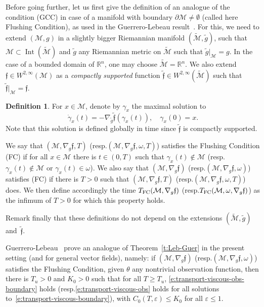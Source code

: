\documentclass[10pt]{amsart}
\newcommand{\FC}{\textup{FC}}
\newcommand{\pFC}{\textup{(FC)}\xspace}
\newcommand{\pGCC}{\textup{(GCC)}\xspace}
\theoremstyle{definition}
\newtheorem{definition}[lemma]{Definition}
\newcommand{\M}{\ensuremath{\mathcal M}}
\newcommand{\mb}[1]{\ensuremath{\mathbb{#1}}}
\newcommand{\R}{{\mb{R}}}
\newcommand{\f}{\ensuremath{\mathfrak{f}}}
\DeclareMathOperator{\Int}{Int}
\let\d\partial
\let\eps\varepsilon
\providecommand{\resp}{resp.}\providecommand{\cf}{cf.}
\begin{document}
Before going further, let us first give the definition of an analogue of the condition \pGCC in case of a manifold with boundary $\d\M \neq \emptyset$ (called here Flushing Condition), as used in the Guerrero-Lebeau result~\cite{GL:07}. For this, we need to extend $(\M,g)$ in a slightly bigger Riemannian manifold $(\tilde{\M}, \tilde{g})$, \ie such that $\M\subset \Int(\tilde{\M})$ and $\tilde{g}$ any Riemannian metric on $\tilde{\M}$ such that $\tilde{g}|_{\M}=g$. In the case of a bounded domain of $\R^n$, one may choose $\tilde{\M} = \R^n$. We also extend $\f \in W^{2,\infty}(\M)$ as a {\em compactly supported } function $\tilde{\f}\in W^{2,\infty}(\tilde{\M})$ such that $\tilde{\f}|_{\M} = \f$.
\begin{definition}
\label{d:def-GCC_bdry}
For $x\in \M$, denote by $\gamma_x$ the maximal solution to
\[
\dot{\gamma}_x(t) = -\nabla_{\tilde{g}}\tilde{\f}(\gamma_x(t)), \quad \gamma_x(0)=x. 
\]
Note that this solution is defined globally in time since $\tilde{\f}$ is compactly supported.

We say that $(\M,\nabla_g \f,T)$ (\resp $(\M,\nabla_g \f,\omega,T)$) satisfies the Flushing Condition \pFC if for all $x\in \M$ there is $t\in (0,T)$ such that $\gamma_x(t)\notin \M$ (\resp $\gamma_x(t)\notin \M$ or $\gamma_x(t)\in \omega$). We also say that $(\M,\nabla_g \f)$ (\resp $(\M,\nabla_g \f,\omega)$) satisfies \pFC if there is $T>0$ such that $(\M,\nabla_g \f,T)$ (\resp $(\M,\nabla_g \f,\omega,T)$) does. We then define accordingly the time $T_{\FC}(\M,\nabla_g \f)$ (\resp $T_{\FC}(\M,\omega,\nabla_g \f)$) as the infimum of $T>0$ for which this property holds.

Remark finally that these definitions do not depend on the extensions $(\tilde{\M}, \tilde{g})$ and~$\tilde{\f}$.
\end{definition}

Guerrero-Lebeau~\cite{GL:07} prove an analogue of Theorem~\ref{t:Leb-Guer} in the present setting (and for general vector fields), namely: if $(\M,\nabla_g \f)$ (\resp $(\M,\nabla_g \f,\omega)$) satisfies the Flushing Condition, given $\theta$ any nontrivial observation function, then there is $T_{u}>0$ and $K_0>0$ such that for all $T\geq T_{u}$, \eqref{e:transport-viscous-obs-boundary} holds (\resp \eqref{e:transport-viscous-obs} holds for all solutions to~\eqref{e:transport-viscous-boundary}), with $C_0(T,\eps)\leq K_0$ for all $\eps \leq 1$.
\end{document}
